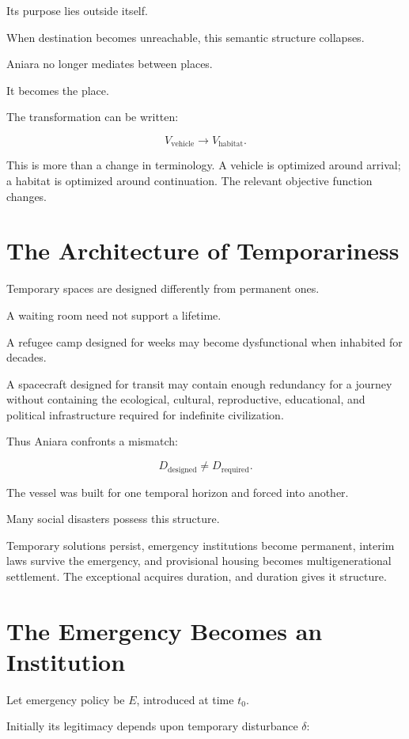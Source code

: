 \documentclass[11pt,oneside]{book}
\theoremstyle{definition}
\theoremstyle{remark}
\begin{document}
Its purpose lies outside itself.

When destination becomes unreachable, this semantic structure collapses.

Aniara no longer mediates between places.

It becomes the place.

The transformation can be written:

\[
V_{\mathrm{vehicle}}
\rightarrow
V_{\mathrm{habitat}}.
\]

This is more than a change in terminology. A vehicle is optimized around arrival; a habitat is optimized around continuation. The relevant objective function changes.

\section{The Architecture of Temporariness}

Temporary spaces are designed differently from permanent ones.

A waiting room need not support a lifetime.

A refugee camp designed for weeks may become dysfunctional when inhabited for decades.

A spacecraft designed for transit may contain enough redundancy for a journey without containing the ecological, cultural, reproductive, educational, and political infrastructure required for indefinite civilization.

Thus Aniara confronts a mismatch:

\[
D_{\mathrm{designed}}
\neq
D_{\mathrm{required}}.
\]

The vessel was built for one temporal horizon and forced into another.

Many social disasters possess this structure.

Temporary solutions persist, emergency institutions become permanent, interim laws survive the emergency, and provisional housing becomes multigenerational settlement. The exceptional acquires duration, and duration gives it structure.

\section{The Emergency Becomes an Institution}

Let emergency policy be \(E\), introduced at time \(t_0\).

Initially its legitimacy depends upon temporary disturbance \(\delta\):
\end{document}

